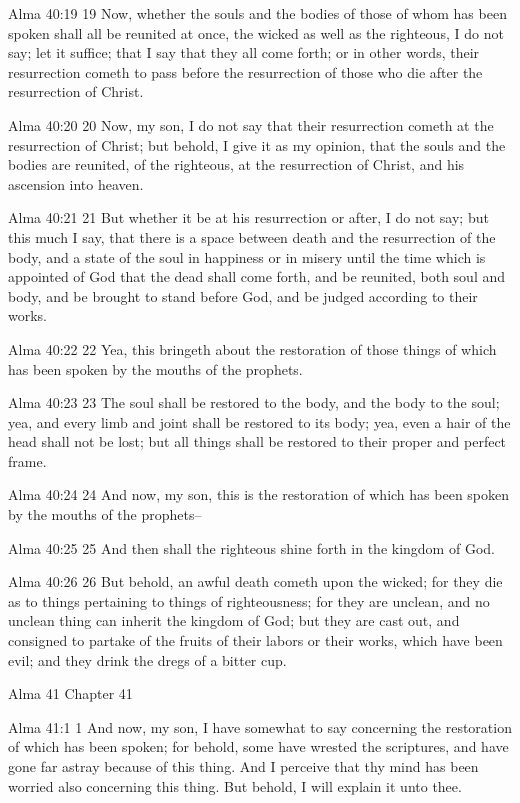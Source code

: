Alma 40:19
 19 Now, whether the souls and the bodies of those of whom has
been spoken shall all be reunited at once, the wicked as well as
the righteous, I do not say; let it suffice; that I say that they
all come forth; or in other words, their resurrection cometh to
pass before the resurrection of those who die after the
resurrection of Christ.

Alma 40:20
 20 Now, my son, I do not say that their resurrection cometh at
the resurrection of Christ; but behold, I give it as my opinion,
that the souls and the bodies are reunited, of the righteous, at
the resurrection of Christ, and his ascension into heaven.

Alma 40:21
 21 But whether it be at his resurrection or after, I do not say;
but this much I say, that there is a space between death and the
resurrection of the body, and a state of the soul in happiness or
in misery until the time which is appointed of God that the dead
shall come forth, and be reunited, both soul and body, and be
brought to stand before God, and be judged according to their
works.

Alma 40:22
 22 Yea, this bringeth about the restoration of those things of
which has been spoken by the mouths of the prophets.

Alma 40:23
 23 The soul shall be restored to the body, and the body to the
soul; yea, and every limb and joint shall be restored to its
body; yea, even a hair of the head shall not be lost; but all
things shall be restored to their proper and perfect frame.

Alma 40:24
 24 And now, my son, this is the restoration of which has been
spoken by the mouths of the prophets--

Alma 40:25
 25 And then shall the righteous shine forth in the kingdom of
God.

Alma 40:26
 26 But behold, an awful death cometh upon the wicked; for they
die as to things pertaining to things of righteousness; for they
are unclean, and no unclean thing can inherit the kingdom of God;
but they are cast out, and consigned to partake of the fruits of
their labors or their works, which have been evil; and they drink
the dregs of a bitter cup.

Alma 41
Chapter 41

Alma 41:1
 1 And now, my son, I have somewhat to say concerning the
restoration of which has been spoken; for behold, some have
wrested the scriptures, and have gone far astray because of this
thing. And I perceive that thy mind has been worried also
concerning this thing. But behold, I will explain it unto thee.


